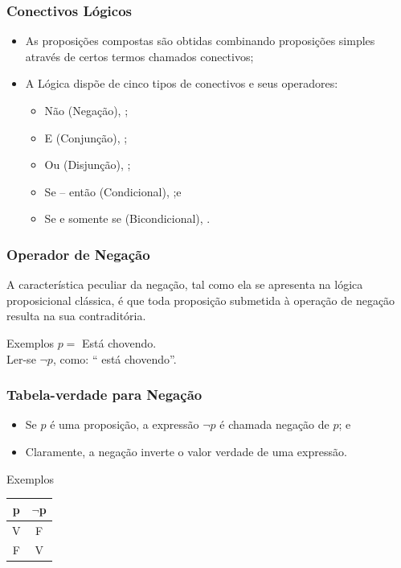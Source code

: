 \documentclass[aspectratio=169]{beamer} %
\begin{document}
\begin{frame}
\frametitle{Conectivos Lógicos}

\begin{itemize}
	\item As proposições compostas são obtidas combinando proposições simples através de certos termos chamados conectivos;
	\item A Lógica dispõe de cinco tipos de conectivos e seus operadores:
	\begin{itemize}
		\item Não (Negação), \structure{$\neg$};
		\item E (Conjunção), \structure{$\wedge$};
		\item Ou (Disjunção), \structure{$\vee$};
		\item Se -- então (Condicional), \structure{$\rightarrow$};e
		\item Se e somente se (Bicondicional), \structure{$\leftrightarrow$}.
	\end{itemize}
\end{itemize}
\end{frame}

\begin{frame}
\frametitle{Operador de Negação}

A característica peculiar da negação, tal como ela se apresenta na lógica proposicional clássica, é que toda proposição submetida à operação de negação resulta na sua contraditória. \vfill

\begin{exampleblock}{Exemplos}
$p =$ Está chovendo.\\
Ler-se $\neg p$, como: `` está chovendo''.
\end{exampleblock}
\end{frame}

\begin{frame}
\frametitle{Tabela-verdade para Negação}

\begin{itemize}
	\item Se $p$ é uma proposição, a expressão $\neg p$ é chamada negação de $p$; e
	\item Claramente, a negação inverte o valor verdade de uma expressão.
\end{itemize} \vfill

\begin{exampleblock}{Exemplos}
\center
\begin{tabular}{|c|c|}
\hline
\textbf{p} & \textbf{$\neg$p}\\ \hline
V & F \\ \hline
F & V \\ \hline
\end{tabular}
\end{exampleblock}
\end{frame}
\end{document}
